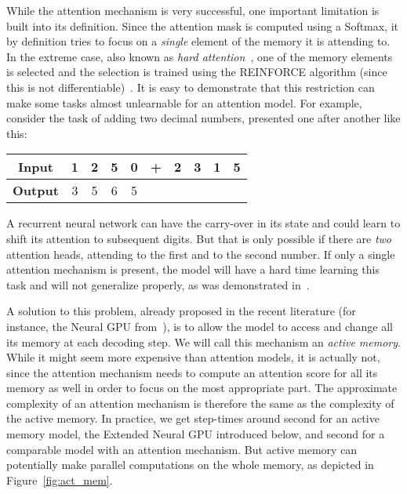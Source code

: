 \documentclass{article}
\begin{document}
While the attention mechanism is very successful, one important
limitation is built into its definition. Since the attention mask
is computed using a Softmax, it by definition tries to focus on
a \emph{single} element of the memory it is attending to. In the
extreme case, also known as {\em hard attention}~\cite{xuetal2015},
one of the memory elements is selected and the selection is trained
using the REINFORCE algorithm  (since this is not differentiable)~\cite{reinforce}.
It is easy to demonstrate that this restriction can make some
tasks almost unlearnable for an attention model. For example,
consider the task of adding two decimal numbers, presented one
after another like this:

\begin{center}
\begin{tabular}{|c||c|c|c|c|c|c|c|c|c|}
\hline
{\bf Input}  & 1 & 2 & 5 & 0 & + & 2 & 3 & 1 & 5 \\ \hline
{\bf Output} & 3 & 5 & 6 & 5 &   &   &   &   &   \\ \hline
\end{tabular}
\end{center}

A recurrent neural network can have the carry-over in its state
and could learn to shift its attention to subsequent digits.
But that is only possible if there are \emph{two} attention heads,
attending to the first and to the second number. If only a single
attention mechanism is present, the model will have a hard time
learning this task and will not generalize properly, as was
demonstrated in~\cite{neural_gpu, stack_rnn}.

A solution to this problem, already proposed in the recent
literature (for instance, the Neural GPU from~\cite{neural_gpu}),
is to allow the model to access and change
all its memory at each decoding step. We will call this mechanism
an {\em active memory}. While it might seem more expensive
than attention models, it is actually not, since
the attention mechanism needs to compute an attention score for all its memory as well
in order to focus on the most appropriate part. The approximate
complexity of an attention mechanism is therefore the same as
the complexity of the active memory. In practice, we get
step-times around  second for an active memory model,
the Extended Neural GPU introduced below, and  second
for a comparable model with an attention mechanism.
But active memory can potentially make parallel computations
on the whole memory, as depicted in Figure~\ref{fig:act_mem}.
\end{document}
